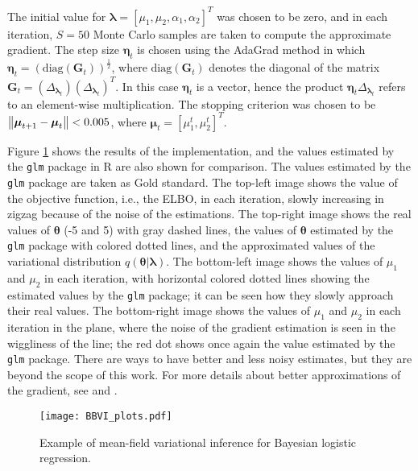 The initial value for $\boldsymbol{\lambda} = \left[ \mu_1, \mu_2, \alpha_1, \alpha_2 \right]^T$ was chosen to be zero, and in each iteration, $S = 50$ Monte Carlo samples are taken to compute the approximate gradient. The step size $\boldsymbol{\eta}_t$ is chosen using the AdaGrad method \cite{duchi2011adaptive} in which
$\boldsymbol{\eta}_t = \left( \mathrm{diag}(\boldsymbol{G}_t) \right)^{\frac{1}{2}}$, where $\mathrm{diag}(\boldsymbol{G}_t)$
denotes the diagonal of the matrix $\boldsymbol{G}_t = \left( \Delta_{\boldsymbol{\lambda}_t} \right) \left( \Delta_{\boldsymbol{\lambda}_t} \right)^T$.
In this case $\boldsymbol{\eta}_t$ is a vector, hence the product $\boldsymbol{\eta}_t \Delta_{\boldsymbol{\lambda}_t}$ refers to an element-wise multiplication.
The stopping criterion was chosen to be
$\left\lVert \boldsymbol{\mu}_{t+1} - \boldsymbol{\mu}_{t} \right\rVert < 0.005$,
where $\boldsymbol{\mu}_t = \left[ \mu_{1}^{t}, \mu_{2}^{t} \right]^T$.

Figure \ref{fig:BBVI_plots} shows the results of the implementation, and the values estimated by the \texttt{glm} package in R are also shown for comparison. The values estimated by the \texttt{glm} package are taken as Gold standard. The top-left image shows the value of the objective function, i.e., the ELBO, in each iteration, slowly increasing in zigzag because of the noise of the estimations. The top-right image shows the real values of $\boldsymbol{\theta}$ (-5 and 5) with gray dashed lines, the values of $\boldsymbol{\theta}$ estimated by the \texttt{glm} package with colored dotted lines, and the approximated values of the variational distribution $q(\boldsymbol{\theta} | \boldsymbol{\lambda})$.
The bottom-left image shows the values of $\mu_1$ and $\mu_2$ in each iteration, with horizontal colored dotted lines showing the estimated values by the \texttt{glm} package; it can be seen how they slowly approach their real values.
The bottom-right image shows the values of $\mu_1$ and $\mu_2$ in each iteration in the plane, where the noise of the gradient estimation is seen in the wiggliness of the line; the red dot shows once again the value estimated by the \texttt{glm} package.
There are ways to have better and less noisy estimates, but they are beyond the scope of this work. For more details about better approximations of the gradient, see \cite{kucukelbir2017automatic} and \cite{ranganath2014black}.

\begin{figure}[H]
    \centering
    \texttt{[image: BBVI\_plots.pdf]}
    \caption{Example of mean-field variational inference for Bayesian logistic regression.}
    \label{fig:BBVI_plots}
\end{figure}

